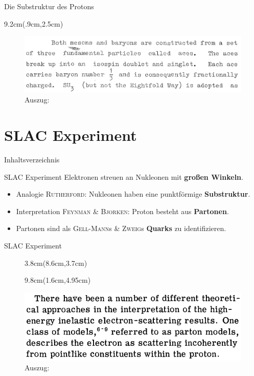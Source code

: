 \documentclass[t,9pt]{beamer}
\newcommand{\highlight}[3]{ \begin{textblock*}{#1}(#2,#3) \begin{tcolorbox} [enhanced,opacityfill=.1,colback=blue] \end{tcolorbox} \end{textblock*} } %
\begin{document}
        \begin{frame}{Die Substruktur des Protons}
                \highlight{9.2cm}{.9cm}{2.5cm}
                \begin{figure}
                        \includegraphics[width=\textwidth]{prosi_zweig_aces.png}
                        \caption{Auszug:\cite{Zweig1964}}
                \end{figure}
        \end{frame}

        \section{SLAC Experiment}

        \begin{frame}{Inhaltsverzeichnis}
                \tableofcontents[currentsection]
        \end{frame}

        \begin{frame}{SLAC Experiment}
                Elektronen streuen an Nukleonen mit \textbf{großen Winkeln}. %
                \begin{itemize}
                        \item Analogie \textsc{Rutherford}: Nukleonen haben eine punktförmige \textbf{Substruktur}.
                                \pause
                        \item Interpretation \textsc{Feynman} \& \textsc{Bjorken}: Proton besteht aus \textbf{Partonen}.
                        \item Partonen sind als \textsc{Gell-Mann}s \& \textsc{Zweig}s \textbf{Quarks} zu identifizieren. %
                \end{itemize}
        \end{frame} 
        
        \begin{frame}{SLAC Experiment}
                \begin{figure}
                        \highlight{3.8cm}{8.6cm}{3.7cm}
                        \highlight{9.8cm}{1.6cm}{4.95cm}
                        \includegraphics[width=\textwidth]{prosi_bloom_et_al_obervations_could_be_parton_model.png}
                        \caption{Auszug:\cite{bloom1969}}
                \end{figure}
        \end{frame}
\end{document}
